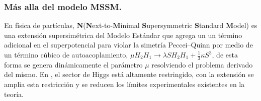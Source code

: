
\subsubsection{Más alla del modelo MSSM.}
En física de partículas, \textbf{N}\MSSM(\textbf{N}ext-to-\textbf{M}inimal \textbf{S}upersymmetric \textbf{S}tandard \textbf{M}odel) es una extensión supersimétrica del Modelo Estándar que agrega un 
un término adicional en el superpotencial para violar la simetría Peccei–Quinn por medio de un término cúbico de autoacoplamiento, $\mu H_2 H_1 \rightarrow \lambda S H_2 H_1 + \frac{1}{3} \kappa S^3$, de esta forma se genera dinámicamente el parámetro $\mu$ resolviendo el problema derivado del mismo. En \MSSM, el sector de Higgs está altamente restringido, con la extensión se amplia esta restricción y se reducen los límites experimentales existentes en la teoría. %


